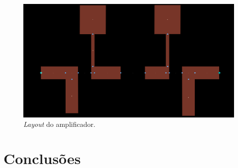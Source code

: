 \documentclass[11pt]{article}
\numberwithin{equation}{section}
\begin{document}
\begin{figure}[H]
	\centering
	\includegraphics[keepaspectratio=true, scale=0.45]{exps/layout}
	\vspace{-0.5em}
	\caption{\textit{Layout} do amplificador.}
	\vspace{-0.8em}
	\label{fig:layout}
\end{figure}

\section{Conclusões}
\end{document}
